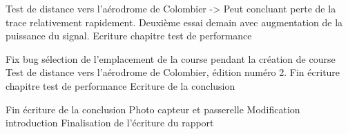 \begin{multicols}{2}
Test de distance vers l’aérodrome de Colombier -> Peut concluant perte de la trace relativement rapidement. Deuxième essai demain avec augmentation de la puissance du signal.
Ecriture chapitre test de performance

Fix bug sélection de l’emplacement de la course pendant la création de course
Test de distance vers l’aérodrome de Colombier, édition numéro 2.
Fin écriture chapitre test de performance
Ecriture de la conclusion

Fin écriture de la conclusion
Photo capteur et passerelle
Modification introduction
Finalisation de l'écriture du rapport

\end{multicols}